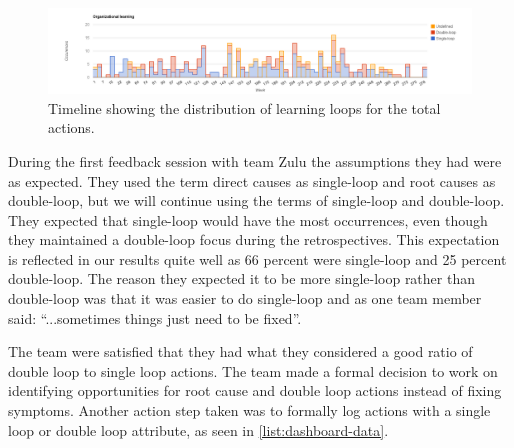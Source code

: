 \begin{table}[!h]
	\begin{center}
	\caption{Results from the content analysis regarding the organizational learning nature of the action.}
	\label{table:organizational-learning-results}
	\end{center}
\end{table}

\begin{figure}
	\centering
	\includegraphics[width=\textwidth, keepaspectratio]{figures/learning-l.png}
	\caption{Timeline showing the distribution of learning loops for the total actions.}
	\label{figure:learning-l}
\end{figure}

\afterpage{\clearpage}

During the first feedback session with team Zulu the assumptions they had were as expected. They used the term direct causes as single-loop and root causes as double-loop, but we will continue using the terms of single-loop and double-loop. They expected that single-loop would have the most occurrences, even though they maintained a double-loop focus during the retrospectives. This expectation is reflected in our results quite well as 66 percent were single-loop and 25 percent double-loop. The reason they expected it to be more single-loop rather than double-loop was that it was easier to do single-loop and as one team member said: ``...sometimes things just need to be fixed''. 

The team were satisfied that they had what they considered a good ratio of double loop to single loop actions. The team made a formal decision to work on identifying opportunities for root cause and double loop actions instead of fixing symptoms. Another action step taken was to formally log actions with a single loop or double loop attribute, as seen in \autoref{list:dashboard-data}.

